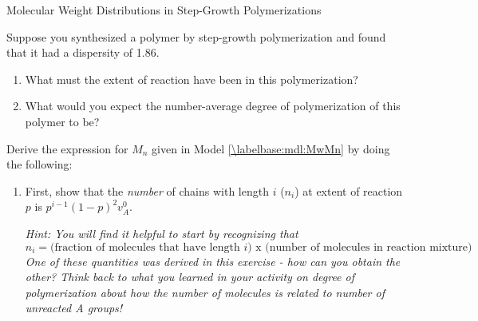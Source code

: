\begin{activity}{Molecular Weight Distributions in Step-Growth Polymerizations}
\begin{ctqs}
\begin{solution}[1.5in]
			\end{solution}
			
			
\end{ctqs}

\begin{exercises}

		\exercise Suppose you synthesized a polymer by step-growth polymerization and found that it had a dispersity of 1.86.
		
			\begin{enumerate}
				\item What must the extent of reaction have been in this polymerization?
		
					\begin{solution}
					\end{solution}
					
				\item What would you expect the number-average degree of polymerization of this polymer to be?
		
					\begin{solution}
					\instructordisplay{
						\begin{equation*}
							N_n = \frac{1}{1-p} = \frac{1}{1-0.86} = 7.1
						\end{equation*}
					}
					\end{solution}
			\end{enumerate}
			
		\exercise Derive the expression for $M_n$ given in Model \ref{\labelbase:mdl:MwMn} by doing the following: \label{labelbase:exc:MnMw}
		
			\begin{enumerate}
				\item First, show that the \emph{number} of chains with length $i$ ($n_i$) at extent of reaction $p$ is $p^{i-1}(1-p)^2v_A^0$.
				
					\emph{Hint: You will find it helpful to start by recognizing that}
					\begin{equation*}
						n_i = \text{(fraction of molecules that }\text{have length }i\text{) x (number of molecules in reaction mixture)}
					\end{equation*}
					\emph{One of these quantities was derived in this exercise - how can you obtain the other?  Think back to what you learned in your activity on degree of polymerization about how the number of molecules is related to number of unreacted A groups!}
					

\end{enumerate}
\end{exercises}
\end{activity}

